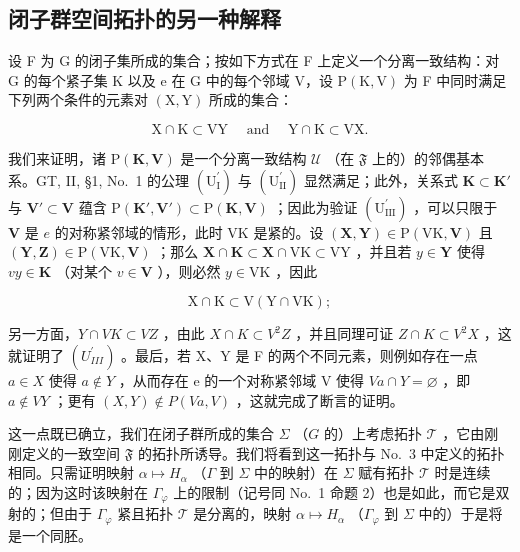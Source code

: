 \subsection{闭子群空间拓扑的另一种解释}

设 F 为 G 的闭子集所成的集合；按如下方式在 F 上定义一个分离一致结构：对 G 的每个紧子集 K 以及 e 在 G 中的每个邻域 V，设 \(\mathrm{P}(\mathrm{K},\mathrm{V})\) 为 F 中同时满足下列两个条件的元素对 \((\mathrm{X},\mathrm{Y})\) 所成的集合：

\[
\mathrm{X} \cap \mathrm{K} \subset \mathrm{VY} \quad \text { and } \quad \mathrm{Y} \cap \mathrm{K} \subset \mathrm{VX}.\tag{9}
\]

我们来证明，诸 \(\mathrm{P}(\mathbf{K},\mathbf{V})\) 是一个分离一致结构 \(\mathcal{U}\) （在 \(\mathfrak{F}\) 上的）的邻偶基本系。GT, II, §1, No.~1 的公理 \((\mathrm{U}_{\mathrm{I}}^{\prime})\) 与 \((\mathrm{U}_{\mathrm{II}}^{\prime})\) 显然满足；此外，关系式 \(\mathbf{K} \subset \mathbf{K}'\) 与 \(\mathbf{V}' \subset \mathbf{V}\) 蕴含 \(\mathrm{P}(\mathbf{K}',\mathbf{V}') \subset \mathrm{P}(\mathbf{K},\mathbf{V})\) ；因此为验证 \((\mathrm{U}_{\mathrm{III}}^{\prime})\) ，可以只限于 \(\mathbf{V}\) 是 \(e\) 的对称紧邻域的情形，此时 VK 是紧的。设 \((\mathbf{X},\mathbf{Y}) \in \mathrm{P}(\mathrm{VK},\mathbf{V})\) 且 \((\mathbf{Y},\mathbf{Z}) \in \mathrm{P}(\mathrm{VK},\mathbf{V})\) ；那么 \(\mathbf{X} \cap \mathbf{K} \subset \mathbf{X} \cap \mathrm{VK} \subset \mathrm{VY}\) ，并且若 \(y \in \mathbf{Y}\) 使得 \(vy \in \mathbf{K}\) （对某个 \(v \in \mathbf{V}\) ），则必然 \(y \in \mathrm{VK}\) ，因此

\[
\mathrm{X} \cap \mathrm{K} \subset \mathrm{V} (\mathrm{Y} \cap \mathrm{VK});
\]

另一方面，\(Y \cap VK \subset VZ\) ，由此 \(X \cap K \subset V^{2}Z\) ，并且同理可证 \(Z \cap K \subset V^{2}X\) ，这就证明了 \((U_{III}^{\prime})\) 。最后，若 X、Y 是 F 的两个不同元素，则例如存在一点 \(a \in X\) 使得 \(a \notin Y\) ，从而存在 e 的一个对称紧邻域 V 使得 \(Va \cap Y = \varnothing\) ，即 \(a \notin VY\) ；更有 \((X,Y) \notin P(Va,V)\) ，这就完成了断言的证明。

这一点既已确立，我们在闭子群所成的集合 \(\Sigma\) （\(G\) 的）上考虑拓扑 \(\mathcal{T}\) ，它由刚刚定义的一致空间 \(\mathfrak{F}\) 的拓扑所诱导。我们将看到这一拓扑与 No.~3 中定义的拓扑相同。只需证明映射 \(\alpha \mapsto H_{\alpha}\) （\(\Gamma\) 到 \(\Sigma\) 中的映射）在 \(\Sigma\) 赋有拓扑 \(\mathcal{T}\) 时是连续的；因为这时该映射在 \(\Gamma_{\varphi}\) 上的限制（记号同 No.~1 命题 2）也是如此，而它是双射的；但由于 \(\Gamma_{\varphi}\) 紧且拓扑 \(\mathcal{T}\) 是分离的，映射 \(\alpha \mapsto H_{\alpha}\) （\(\Gamma_{\varphi}\) 到 \(\Sigma\) 中的）于是将是一个同胚。

